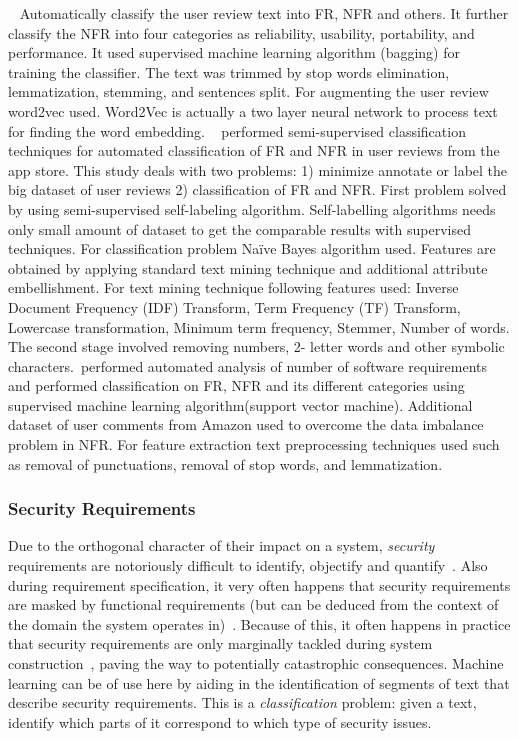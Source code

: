\etal~\cite{} Automatically classify the user review text into FR, NFR and others. It further classify the NFR into four categories as reliability, usability, portability, and performance. It used supervised machine learning algorithm (bagging) for training the classifier. The text was trimmed by stop words elimination, lemmatization, stemming, and sentences split. For augmenting the user review word2vec used. Word2Vec is actually a two layer neural network to process text for finding the word embedding. \etal~\cite {Deocadez:2017} performed semi-supervised classification techniques for automated classification of FR and NFR in user reviews from the app store. This study deals with two problems: 1) minimize annotate or label the big dataset of user reviews 2) classification of FR and NFR. First problem solved by using semi-supervised self-labeling algorithm. Self-labelling algorithms needs only small amount of dataset to get the comparable results with supervised techniques. For classification problem Naïve Bayes algorithm used. Features are obtained by applying standard text mining technique and additional attribute embellishment. For text mining technique following features used:  Inverse Document Frequency (IDF) Transform, Term Frequency (TF) Transform, Lowercase transformation, Minimum term frequency, Stemmer, Number of words. The second stage involved removing numbers, 2- letter words and other symbolic characters.\etal~\cite{ Kurtanovic:2017}performed automated analysis of number of software requirements and performed classification on FR, NFR and its different categories using supervised machine learning algorithm(support vector machine). Additional dataset of user comments from Amazon used to overcome the data imbalance problem in NFR. For feature extraction text preprocessing techniques used such as removal of punctuations, removal of stop words, and lemmatization. 


\subsubsection{Security Requirements} 

Due to the orthogonal character of their impact on a system, \emph{security}
requirements are notoriously difficult to identify, objectify and
quantify~\cite{}. Also during requirement specification, it very often
happens that security requirements are masked by functional requirements
(but can be deduced from the context of the domain the system operates
in)~\cite{Riaz:2014}. Because of this, it often happens in practice that
security requirements are only marginally tackled during system
construction~\cite{}, paving the way to potentially catastrophic consequences.
Machine learning can be of use here by aiding in the identification of segments
of text that describe security requirements. This is a \emph{classification}
problem: given a text, identify which parts of it correspond to which
type of security issues.\\

